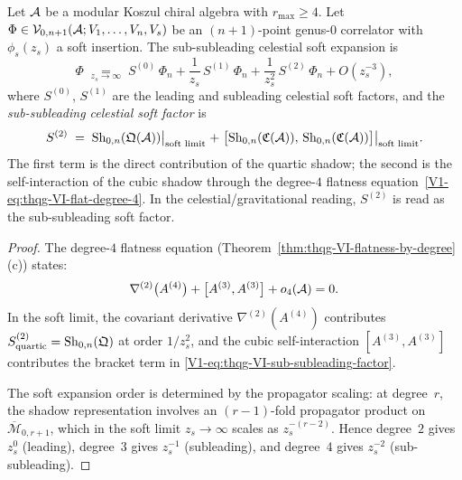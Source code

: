 \begin{theorem}
\label{thm:thqg-VI-sub-subleading-soft}
Let $\mathcal{A}$ be a modular Koszul chiral algebra with $r_{\max} \geq 4$.
Let $\Phi \in \mathcal{V}_{0,n+1}(\mathcal{A}; V_1, \dotsc, V_n, V_s)$ be an
$(n+1)$-point genus-$0$ correlator with $\phi_s(z_s)$ a soft
insertion. The sub-subleading celestial soft expansion is
\begin{equation}%
\Phi
\;\underset{z_s \to \infty}{=}\;
S^{(0)}\,\Phi_n
+ \frac{1}{z_s}\,S^{(1)}\,\Phi_n
+ \frac{1}{z_s^2}\,S^{(2)}\,\Phi_n
+ O(z_s^{-3}),
\end{equation}
where $S^{(0)}$, $S^{(1)}$ are the leading and subleading celestial
soft factors, and the \emph{sub-subleading celestial soft factor} is
\begin{equation}%
S^{(2)}
\;=\;
\Sh_{0,n}(\mathfrak{Q}(\cA))\bigl|_{\text{soft limit}}
\;+\;
\bigl[\Sh_{0,n}(\mathfrak{C}(\cA)),\,
\Sh_{0,n}(\mathfrak{C}(\cA))\bigr]\bigl|_{\text{soft limit}}.
\end{equation}
The first term is the direct contribution of the quartic shadow;
the second is the self-interaction of the cubic shadow through the
degree-$4$ flatness equation~\eqref{V1-eq:thqg-VI-flat-degree-4}. In the
celestial/gravitational reading, $S^{(2)}$ is read as the
sub-subleading soft factor.
\end{theorem}

\begin{proof}
The degree-$4$ flatness equation
(Theorem~\ref{thm:thqg-VI-flatness-by-degree}(c)) states:
\[
\nabla^{(2)}\bigl(A^{(4)}\bigr)
+ \bigl[A^{(3)}, A^{(3)}\bigr]
+ o_4(\mathcal{A})
= 0.
\]
In the soft limit, the covariant derivative $\nabla^{(2)}(A^{(4)})$
contributes $S^{(2)}_{\mathrm{quartic}} = \operatorname{Sh}_{0,n}(\mathfrak{Q})$
at order $1/z_s^2$, and the cubic self-interaction
$[A^{(3)}, A^{(3)}]$ contributes the bracket term in
\eqref{V1-eq:thqg-VI-sub-subleading-factor}.

The soft expansion order is determined by the propagator scaling:
at degree~$r$, the shadow representation involves an
$(r-1)$-fold propagator product on $\overline{\mathcal{M}}_{0,r+1}$,
which in the soft limit $z_s \to \infty$ scales as
$z_s^{-(r-2)}$. Hence degree~$2$ gives $z_s^0$ (leading),
degree~$3$ gives $z_s^{-1}$ (subleading), and degree~$4$ gives
$z_s^{-2}$ (sub-subleading).
\end{proof}

